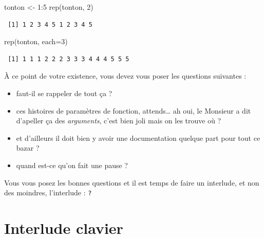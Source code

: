 \documentclass[
  letterpaper,
  DIV=11,
  numbers=noendperiod]{scrreprt}
\newenvironment{Shaded}{\begin{snugshade}}{\end{snugshade}}
\newcommand{\AttributeTok}[1]{\textcolor[rgb]{0.40,0.45,0.13}{#1}}
\newcommand{\DecValTok}[1]{\textcolor[rgb]{0.68,0.00,0.00}{#1}}
\newcommand{\FunctionTok}[1]{\textcolor[rgb]{0.28,0.35,0.67}{#1}}
\newcommand{\NormalTok}[1]{\textcolor[rgb]{0.00,0.23,0.31}{#1}}
\newcommand{\OtherTok}[1]{\textcolor[rgb]{0.00,0.23,0.31}{#1}}
\newcommand{\SpecialCharTok}[1]{\textcolor[rgb]{0.37,0.37,0.37}{#1}}
\providecommand{\tightlist}{%
  \setlength{\itemsep}{0pt}\setlength{\parskip}{0pt}}\usepackage{longtable,booktabs,array}
\begin{document}
\begin{Shaded}
\begin{Highlighting}[]
\NormalTok{tonton }\OtherTok{\textless{}{-}} \DecValTok{1}\SpecialCharTok{:}\DecValTok{5}
\FunctionTok{rep}\NormalTok{(tonton, }\DecValTok{2}\NormalTok{)}
\end{Highlighting}
\end{Shaded}

\begin{verbatim}
 [1] 1 2 3 4 5 1 2 3 4 5
\end{verbatim}

\begin{Shaded}
\begin{Highlighting}[]
\FunctionTok{rep}\NormalTok{(tonton, }\AttributeTok{each=}\DecValTok{3}\NormalTok{)}
\end{Highlighting}
\end{Shaded}

\begin{verbatim}
 [1] 1 1 1 2 2 2 3 3 3 4 4 4 5 5 5
\end{verbatim}

À ce point de votre existence, vous devez vous poser les questions
suivantes :

\begin{itemize}
\tightlist
\item
  faut-il se rappeler de tout ça ?
\item
  ces histoires de paramètres de fonction, attends\ldots{} ah oui, le
  Monsieur a dit d'apeller ça des \emph{arguments}, c'est bien joli mais
  on les trouve où ?
\item
  et d'ailleurs il doit bien y avoir une documentation quelque part pour
  tout ce bazar ?
\item
  quand est-ce qu'on fait une pause ?
\end{itemize}

Vous vous posez les bonnes questions et il est temps de faire un
interlude, et non des moindres, l'interlude : \texttt{?}

\hypertarget{interlude-clavier}{%
\section{Interlude clavier}\label{interlude-clavier}}
\end{document}
